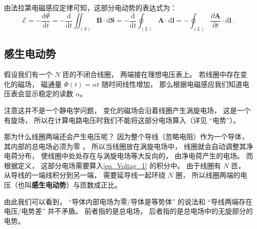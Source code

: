由法拉第电磁感应定律可知，这部分电动势的表达式为：
\begin{equation}
\mathscr{E}=-\frac{\mathrm{d} \Phi}{\mathrm{d} t}=-\frac{\mathrm{d}}{\mathrm{d} t} \iint_{(S)} \boldsymbol{B} \cdot \mathrm{d} \boldsymbol{S}=-\frac{\mathrm{d}}{\mathrm{d} t} \oint_{(L)} \boldsymbol{A} \cdot \mathrm{d} \boldsymbol{l}=-\oint_{(L)} \frac{\partial \boldsymbol{A}}{\partial t} \cdot \mathrm{d} \boldsymbol{l}~.
\end{equation}

\subsection{感生电动势}
\begin{example}{}
假设我们有一个 $N$ 匝的不闭合线圈， 两端接在理想电压表上。 若线圈中存在变化的磁场， 磁通量 $\Phi(t) = \alpha t$ 随时间线性增加， 那么根据电磁感应我们知道电压表会显示稳定的读数 $\alpha$。

注意这并不是一个静电学问题， 变化的磁场会沿着线圈产生涡旋电场， 这是一个有旋场， 所以在计算电路电压时我们不能将这部分电场算入（详见 “电势”）。

那为什么线圈两端还会产生电压呢？ 因为整个导线（忽略电阻）作为一个导体， 其内部的总电场必须为零%
， 所以当线圈放在涡旋电场中， 线圈就会自动调整其净电荷分布， 使线圈中处处存在与涡旋电场等大反向的， 由净电荷产生的电场。 而根据定义， 这部分电场需要算入\autoref{eq_Voltag_1} 的积分中。 由于线圈有 $N$ 匝， 从导线的一端线积分到另一端， 需要延导线一起环绕 $N$ 圈， 所以线圈两端的电压（也叫\textbf{感生电动势}）与匝数成正比。
\end{example}

由此我们可以看到， “导体内部电场为零/导体是等势体” 的说法和 “导线两端存在电压/电势差” 并不矛盾。 前者指的是总电场， 后者指的是总电场中的无旋部分的电势。
